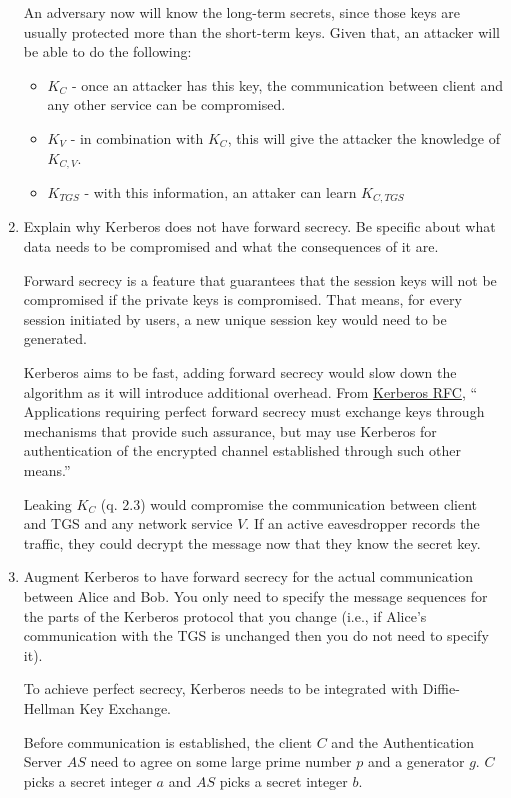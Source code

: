 \documentclass[11pt]{article}
\begin{document}
\begin{enumerate}
    An adversary now will know the long-term secrets, since those keys are usually protected more than the short-term keys. Given that, an attacker will be able to do the following:

    \begin{itemize}
      \item $K_{C}$ - once an attacker has this key, the communication between client and any other service can be compromised.
      \item $K_{V}$ - in combination with $K_{C}$, this will give the attacker the knowledge of $K_{C, V}$.
      \item $K_{TGS}$ - with this information, an attaker can learn $K_{C, TGS}$
    \end{itemize}

    \item  Explain why Kerberos does not have forward secrecy. Be specific about what data needs to be compromised and what the consequences of it are.

    Forward secrecy is a feature that guarantees that the session keys will not be compromised if the private keys is compromised. That means, for every session initiated by users, a new unique session key would need to be generated.

    Kerberos aims to be fast, adding forward secrecy would slow down the algorithm as it will introduce additional overhead. From \href{https://tools.ietf.org/html/rfc4120}{Kerberos RFC}, `` Applications requiring perfect forward secrecy must exchange keys through mechanisms that provide such assurance, but may use Kerberos for authentication of the encrypted channel established through such other means.''

    Leaking $K_{C}$ (q. 2.3) would compromise the communication between client and TGS and any network service $V$. If an active eavesdropper records the traffic, they could decrypt the message now that they know the secret key.

    \item Augment Kerberos to have forward secrecy for the actual communication between Alice and Bob. You only need to specify the message sequences for the parts of the Kerberos protocol that you change (i.e., if Alice’s communication with the TGS is unchanged then you do not need to specify it).

    To achieve perfect secrecy, Kerberos needs to be integrated with Diffie-Hellman Key Exchange.
    
    Before communication is established, the client $C$ and the Authentication Server $AS$ need to agree on some large prime number $p$ and a generator $g$. $C$ picks a secret integer $a$ and $AS$ picks a secret integer $b$.  


\end{enumerate}
\end{document}

